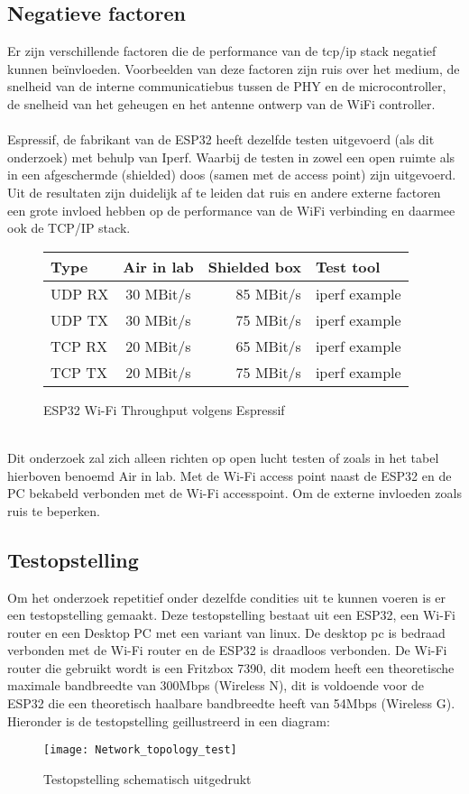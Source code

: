 \documentclass[../DCM2_Verslag.tex]{subfiles}
\begin{document}
\subsection{Negatieve factoren}
Er zijn verschillende factoren die de performance van de tcp/ip stack negatief kunnen beïnvloeden. Voorbeelden van deze factoren zijn ruis over het medium, de snelheid van de interne communicatiebus tussen de PHY en de microcontroller, de snelheid van het geheugen en het antenne ontwerp van de WiFi controller.\\\\
Espressif, de fabrikant van de ESP32 heeft dezelfde testen uitgevoerd (als dit onderzoek) met behulp van Iperf. Waarbij de testen in zowel een open ruimte als in een afgeschermde (shielded) doos (samen met de access point) zijn uitgevoerd. Uit de resultaten zijn duidelijk af te leiden dat ruis en andere externe factoren een grote invloed hebben op de performance van de WiFi verbinding en daarmee ook de TCP/IP stack.\\
\begin{figure}[h]
\begin{tabular}{||l|c|r|p{6cm}||}
	 \hline
 	 Type & Air in lab & Shielded box & Test tool \\
  	 \hline \hline    
   	 UDP RX & 30 MBit/s & 85 MBit/s & iperf example \\
   	 UDP TX & 30 MBit/s & 75 MBit/s & iperf example \\
   	 TCP RX & 20 MBit/s & 65 MBit/s & iperf example \\
   	 TCP TX & 20 MBit/s & 75 MBit/s & iperf example \\
\end{tabular}
\caption{ESP32 Wi-Fi Throughput volgens Espressif}
\end{figure}
\\Dit onderzoek zal zich alleen richten op open lucht testen of zoals in het tabel hierboven benoemd Air in lab. Met de Wi-Fi access point naast de ESP32 en de PC bekabeld verbonden met de Wi-Fi accesspoint. Om de externe invloeden zoals ruis te beperken.

\subsection{Testopstelling}
Om het onderzoek repetitief onder dezelfde condities uit te kunnen voeren is er een testopstelling gemaakt. Deze testopstelling bestaat uit een ESP32, een Wi-Fi router en een Desktop PC met een variant van linux. De desktop pc is bedraad verbonden met de Wi-Fi router en de ESP32 is draadloos verbonden. De Wi-Fi router die gebruikt wordt is een Fritzbox 7390, dit modem heeft een theoretische maximale bandbreedte van 300Mbps (Wireless N), dit is voldoende voor de ESP32 die een theoretisch haalbare bandbreedte heeft van 54Mbps (Wireless G). Hieronder is de testopstelling geillustreerd in een diagram:
\begin{figure}[h]
\centering
\texttt{[image: Network\_topology\_test]}
\caption{Testopstelling schematisch uitgedrukt}
\end{figure}
\end{document}
